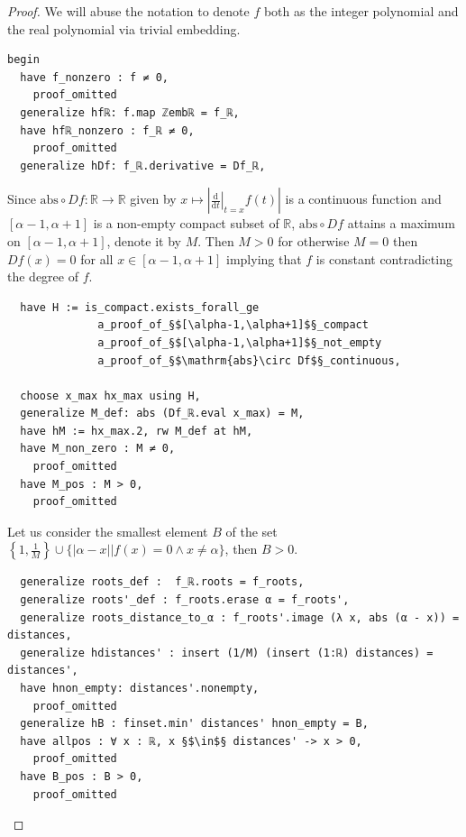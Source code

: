 \documentclass{report}
\theoremstyle{definition}
\begin{document}
\begin{proof}
We will abuse the notation to denote $f$ both as the integer polynomial and the real polynomial via trivial embedding.
\begin{verbatim}
begin
  have f_nonzero : f ≠ 0,
    proof_omitted
  generalize hfℝ: f.map ℤembℝ = f_ℝ,
  have hfℝ_nonzero : f_ℝ ≠ 0,
    proof_omitted
  generalize hDf: f_ℝ.derivative = Df_ℝ,
\end{verbatim}

Since $\mathrm{abs}\circ Df : \mathbb R\to\mathbb R$ given by $x\mapsto \left|\left.\frac{\mathrm d}{\mathrm d t}\right|_{t=x}f(t)\right|$ is a continuous function and $[\alpha-1,\alpha+1]$ is a non-empty compact subset of $\mathbb R$, $\mathrm{abs} \circ Df$ attains a maximum on $[\alpha-1,\alpha+1]$, denote it by $M$. Then $M>0$ for otherwise $M=0$ then $Df(x)=0$ for all $x\in[\alpha-1,\alpha+1]$ implying that $f$ is constant contradicting the degree of $f$.

\begin{verbatim}
  have H := is_compact.exists_forall_ge 
              a_proof_of_§$[\alpha-1,\alpha+1]$§_compact
              a_proof_of_§$[\alpha-1,\alpha+1]$§_not_empty
              a_proof_of_§$\mathrm{abs}\circ Df$§_continuous,

  choose x_max hx_max using H,
  generalize M_def: abs (Df_ℝ.eval x_max) = M,
  have hM := hx_max.2, rw M_def at hM,
  have M_non_zero : M ≠ 0,
    proof_omitted
  have M_pos : M > 0,
    proof_omitted
\end{verbatim}

Let us consider the smallest element $B$ of the set $\left\{1, \frac 1 M\right\}\cup\{\left|\alpha-x\right|| f(x)=0 \land x\ne\alpha\}$, then $B>0$.
\begin{verbatim}
  generalize roots_def :  f_ℝ.roots = f_roots,
  generalize roots'_def : f_roots.erase α = f_roots',
  generalize roots_distance_to_α : f_roots'.image (λ x, abs (α - x)) = distances,
  generalize hdistances' : insert (1/M) (insert (1:ℝ) distances) = distances',
  have hnon_empty: distances'.nonempty, 
    proof_omitted
  generalize hB : finset.min' distances' hnon_empty = B,
  have allpos : ∀ x : ℝ, x §$\in$§ distances' -> x > 0,
    proof_omitted
  have B_pos : B > 0,
    proof_omitted
\end{verbatim}


\end{proof}
\end{document}

